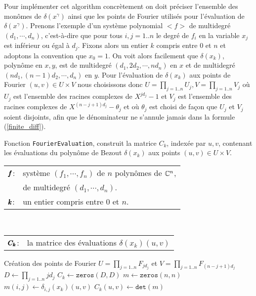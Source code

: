 \documentclass{standalone}
\begin{document}
Pour implémenter cet algorithm concrètement on doit préciser l'ensemble des monômes de $\delta(x^\gamma)$ ainsi que les points de Fourier utilisés pour l'évaluation de $\delta(x^\gamma)$. Prenons l'exemple d'un système polynomial $<f>$ de multidegré $(d_1, \cdots, d_n)$, c'est-à-dire que pour tous $i, j = 1..n$ le degré de $f_i$ en la variable $x_j$ est inférieur ou égal à $d_j$. Fixons alors un entier $k$ compris entre $0$ et $n$ et adoptons la convention que $x_0 = 1$. On voit alors facilement que $\delta(x_k)$, polynôme en $x, y$, est de multidegré $(d_1, 2d_2, \cdots, nd_n)$ en $x$ et de multidegré $(nd_1, (n-1)d_2, \cdots, d_n)$ en $y$.
 Pour l'évaluation de $\delta(x_k)$ aux points de Fourier $(u, v) \in U\times V$ nous choisissons donc $U = \prod_{j=1..n} U_j, V = \prod_{j=1..n} V_j$ o\`u $U_j$ est l'ensemble des racines complexes de $X^{jd_j} - 1$ et $V_j$ est l'ensemble des racines complexes de $X^{(n-j+1)d_j} - \theta_j$ et o\`u $\theta_j$ est choisi de façon que $U_j$ et $V_j$ soient disjoints, afin que le dénominateur ne s'annule jamais dans la formule (\ref{finite_diff}).

\begin{algorithm}[H]
\caption{Fonction \texttt{FourierEvaluation}, construit la matrice $C_k$, indexée par $u, v$, contenant les évaluations du polynôme de Bezout $\delta(x_k)$ aux points $(u, v) \in U\times V$.}\label{algo:01}
  \begin{tabular}[t]{ll}
    $\pmb{f}$: & système $(f_1, \cdots, f_n)$ de $n$ polynômes de $\mathbb{C}^n$,\\ {} & de multidegré $(d_1, \cdots, d_n)$.\\

     $\pmb{k}$: & un entier compris entre $0$ et $n$.
  \end{tabular}\\
  \begin{tabular}[t]{ll}
      $\pmb{C_k}$: & la matrice des évaluations $\delta(x_k)(u, v)$
  \end{tabular}
\begin{algorithmic}
	\State Création des points de Fourier $U = \prod_{j=1..n} F_{jd_j}$ et $V = \prod_{j=1..n} F_{(n-j+1)d_j}$
  \State $D \gets \prod_{j=1..n}jd_j$
	\State $C_k \gets \texttt{zeros}(D, D)$
      \State $m \gets \texttt{zeros}(n, n)$
      		\State $m(i, j) \gets \delta_{i,j}(x_k)(u, v)$
   		\EndFor
		\State $C_k(u, v) \gets \texttt{det}(m)$
	\EndFor
\EndFunction
\end{algorithmic}
\end{algorithm}
\end{document}
